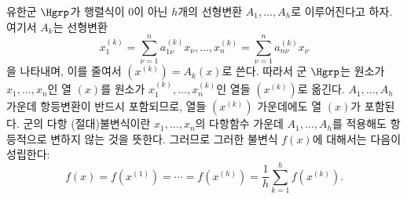 
유한군 $\Hgrp$가 행렬식이 0이 아닌 $h$개의 선형변환 $A_1,\ldots,A_h$로 이루어진다고 하자. 여기서 $A_k$는 선형변환
\[
  x_1^{(k)}=\sum_{\nu=1}^{n}a_{1\nu}^{(k)}x_\nu,\ldots,
  x_n^{(k)}=\sum_{\nu=1}^{n}a_{n\nu}^{(k)}x_\nu
\]
을 나타내며, 이를 줄여서 $(x^{(k)})=A_k(x)$로 쓴다. 따라서 군 $\Hgrp$는 원소가 $x_1,\ldots,x_n$인 열 $(x)$를 원소가 $x_1^{(k)},\ldots,x_n^{(k)}$인 열들 $(x^{(k)})$로 옮긴다. $A_1,\ldots,A_h$ 가운데 항등변환이 반드시 포함되므로, 열들 $(x^{(k)})$ 가운데에도 열 $(x)$가 포함된다. 군의 다항 (절대)불변식이란 $x_1,\ldots,x_n$의 다항함수 가운데 $A_1,\ldots,A_h$를 적용해도 항등적으로 변하지 않는 것을 뜻한다. 그러므로 그러한 불변식 $f(x)$에 대해서는 다음이 성립한다:
\begin{equation}
  f(x)=f(x^{(1)})=\cdots=f(x^{(h)})=
  \frac1h\sum_{k=1}^{h}f(x^{(k)}).
\tag{1}
\end{equation}
